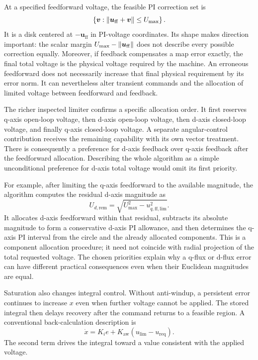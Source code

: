 At a specified feedforward voltage, the feasible PI correction set is
\begin{equation}
 \left\{\bm v:\left\lVert\bm u_{\mathrm{ff}}+\bm v\right\rVert\le U_{\max}\right\}.
 \label{eq:control-correction-set}
\end{equation}
It is a disk centered at $-\bm u_{\mathrm{ff}}$ in PI-voltage coordinates. Its shape makes direction important: the scalar margin $U_{\max}-\left\lVert\bm u_{\mathrm{ff}}\right\rVert$ does not describe every possible correction equally. Moreover, if feedback compensates a map error exactly, the final total voltage is the physical voltage required by the machine. An erroneous feedforward does not necessarily increase that final physical requirement by its error norm. It can nevertheless alter transient commands and the allocation of limited voltage between feedforward and feedback.

The richer inspected limiter confirms a specific allocation order. It first reserves q-axis open-loop voltage, then d-axis open-loop voltage, then d-axis closed-loop voltage, and finally q-axis closed-loop voltage. A separate angular-control contribution receives the remaining capability with its own vector treatment. There is consequently a preference for d-axis feedback over q-axis feedback after the feedforward allocation. Describing the whole algorithm as a simple unconditional preference for d-axis total voltage would omit its first priority.

For example, after limiting the q-axis feedforward to the available magnitude, the algorithm computes the residual d-axis magnitude as
\begin{equation}
 U_{d,\mathrm{rem}}=
 \sqrt{U_{\max}^2-u_{q,\mathrm{ff,lim}}^2}.
\end{equation}
It allocates d-axis feedforward within that residual, subtracts its absolute magnitude to form a conservative d-axis PI allowance, and then determines the q-axis PI interval from the circle and the already allocated components. This is a component allocation procedure; it need not coincide with radial projection of the total requested voltage. The chosen priorities explain why a q-flux or d-flux error can have different practical consequences even when their Euclidean magnitudes are equal.

Saturation also changes integral control. Without anti-windup, a persistent error continues to increase $x$ even when further voltage cannot be applied. The stored integral then delays recovery after the command returns to a feasible region. A conventional back-calculation description is
\begin{equation}
 \dot x=K_ie+K_{\mathrm{aw}}(u_{\mathrm{lim}}-u_{\mathrm{req}}).
 \label{eq:control-aw-generic}
\end{equation}
The second term drives the integral toward a value consistent with the applied voltage.

